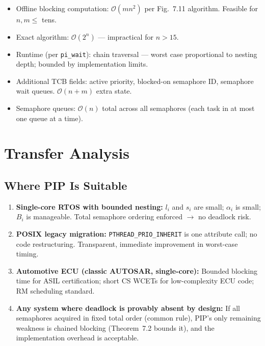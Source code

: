 \documentclass[conference,onecolumn]{IEEEtran}
\begin{document}
\begin{itemize}
  \item Offline blocking computation: $\mathcal{O}(mn^2)$ per
        Fig.~7.11 algorithm. Feasible for $n, m \leq$ tens.
  \item Exact algorithm: $\mathcal{O}(2^n)$ --- impractical for
        $n > 15$.
  \item Runtime (per \texttt{pi\_wait}): chain traversal --- worst case
        proportional to nesting depth; bounded by implementation limits.
  \item Additional TCB fields: active priority, blocked-on semaphore ID,
        semaphore wait queues. $\mathcal{O}(n + m)$ extra state.
  \item Semaphore queues: $\mathcal{O}(n)$ total across all semaphores
        (each task in at most one queue at a time).
\end{itemize}

\section{Transfer Analysis}

\subsection{Where PIP Is Suitable}

\begin{enumerate}
  \item \textbf{Single-core RTOS with bounded nesting:} $l_i$ and $s_i$
        are small; $\alpha_i$ is small; $B_i$ is manageable.
        Total semaphore ordering enforced $\to$ no deadlock risk.
  \item \textbf{POSIX legacy migration:} \texttt{PTHREAD\_PRIO\_INHERIT}
        is one attribute call; no code restructuring.
        Transparent, immediate improvement in worst-case timing.
  \item \textbf{Automotive ECU (classic AUTOSAR, single-core):}
        Bounded blocking time for ASIL certification;
        short CS WCETs for low-complexity ECU code;
        RM scheduling standard.
  \item \textbf{Any system where deadlock is provably absent by design:}
        If all semaphores acquired in fixed total order (common rule),
        PIP's only remaining weakness is chained blocking (Theorem~7.2
        bounds it), and the implementation overhead is acceptable.
\end{enumerate}
\end{document}
